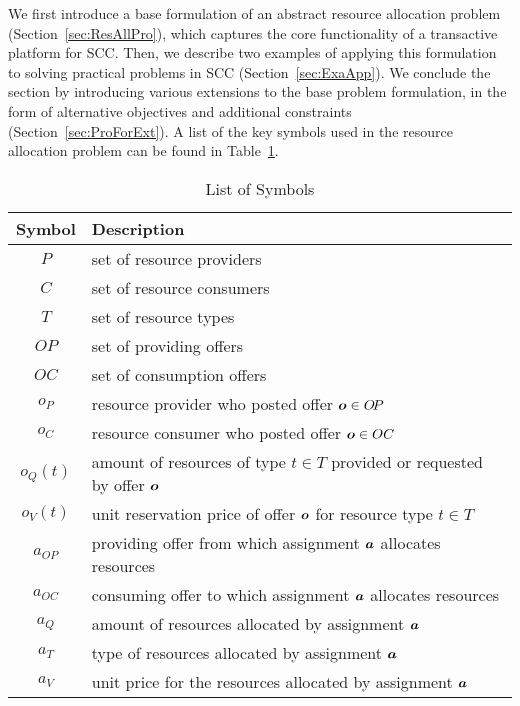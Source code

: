 


We first introduce a base formulation of an abstract resource allocation problem (Section~\ref{sec:ResAllPro}), which captures the core functionality of a transactive platform for SCC.
Then, we describe two  examples of applying this formulation to solving practical problems in SCC (Section~\ref{sec:ExaApp}).
We conclude the section by introducing various extensions to the base problem formulation, in the form of alternative objectives and additional constraints (Section~\ref{sec:ProForExt}).
A list of the key symbols used in the resource allocation problem can be found in Table~\ref{tab:symbols}.

\begin{table}[t]
    \centering
    \caption{List of Symbols}
    \label{tab:symbols}
    \renewcommand{\arraystretch}{1.2}
    \begin{tabular}{|c|p{6.86cm}|}
        \hline
        Symbol & Description \\
        \hline
        \rowcolor{Gray} $P$ & set of resource providers \\
        $C$ & set of resource consumers \\
        \rowcolor{Gray} $T$ & set of resource types \\
        $O\!P$ & set of providing offers \\
        \rowcolor{Gray} $OC$ & set of consumption offers \\
        $o_P$ & resource provider who posted offer $\boldsymbol{o} \in O\!P$ \\
        \rowcolor{Gray} $o_C$ & resource consumer who posted offer $\boldsymbol{o} \in OC$ \\
        $o_Q(t)$ & amount of resources of type $t \in T$ provided or requested by offer $\boldsymbol{o}$ \\
        \rowcolor{Gray} $o_V(t)$ & unit reservation price of offer $\boldsymbol{o}$ for resource type $t \in T$ \\
        $a_{O\!P}$ & providing offer from which assignment $\boldsymbol{a}$ allocates resources \\
        \rowcolor{Gray} $a_{OC}$ & consuming offer to which assignment $\boldsymbol{a}$ allocates resources \\
        $a_Q$ & amount of resources allocated by assignment $\boldsymbol{a}$ \\
        \rowcolor{Gray} $a_T$ & type of resources allocated by assignment $\boldsymbol{a}$ \\
        $a_V$ & unit price for the resources allocated by assignment $\boldsymbol{a}$ \\
        \hline
    \end{tabular}
\end{table}



